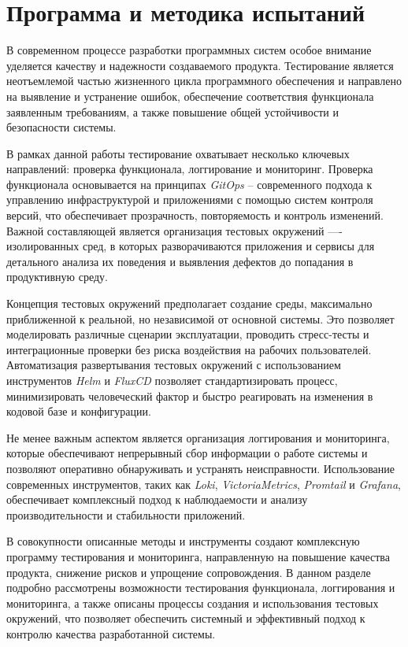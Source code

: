 \section{Программа и методика испытаний}

В современном процессе разработки программных систем особое внимание уделяется качеству и надежности создаваемого продукта. Тестирование является неотъемлемой частью жизненного цикла программного обеспечения и направлено на выявление и устранение ошибок, обеспечение соответствия функционала заявленным требованиям, а также повышение общей устойчивости и безопасности системы. 

В рамках данной работы тестирование охватывает несколько ключевых направлений: проверка функционала, логгирование и мониторинг. Проверка функционала основывается на принципах \textit{GitOps} -- современного подхода к управлению инфраструктурой и приложениями с помощью систем контроля версий, что обеспечивает прозрачность, повторяемость и контроль изменений. Важной составляющей является организация тестовых окружений —- изолированных сред, в которых разворачиваются приложения и сервисы для детального анализа их поведения и выявления дефектов до попадания в продуктивную среду.

Концепция тестовых окружений предполагает создание среды, максимально приближенной к реальной, но независимой от основной системы. Это позволяет моделировать различные сценарии эксплуатации, проводить стресс-тесты и интеграционные проверки без риска воздействия на рабочих пользователей. Автоматизация развертывания тестовых окружений с использованием инструментов \textit{Helm} и \textit{FluxCD} позволяет стандартизировать процесс, минимизировать человеческий фактор и быстро реагировать на изменения в кодовой базе и конфигурации.

Не менее важным аспектом является организация логгирования и мониторинга, которые обеспечивают непрерывный сбор информации о работе системы и позволяют оперативно обнаруживать и устранять неисправности. Использование современных инструментов, таких как \textit{Loki}, \textit{VictoriaMetrics}, \textit{Promtail} и \textit{Grafana}, обеспечивает комплексный подход к наблюдаемости и анализу производительности и стабильности приложений.

В совокупности описанные методы и инструменты создают комплексную программу тестирования и мониторинга, направленную на повышение качества продукта, снижение рисков и упрощение сопровождения. В данном разделе подробно рассмотрены возможности тестирования функционала, логгирования и мониторинга, а также описаны процессы создания и использования тестовых окружений, что позволяет обеспечить системный и эффективный подход к контролю качества разработанной системы.

